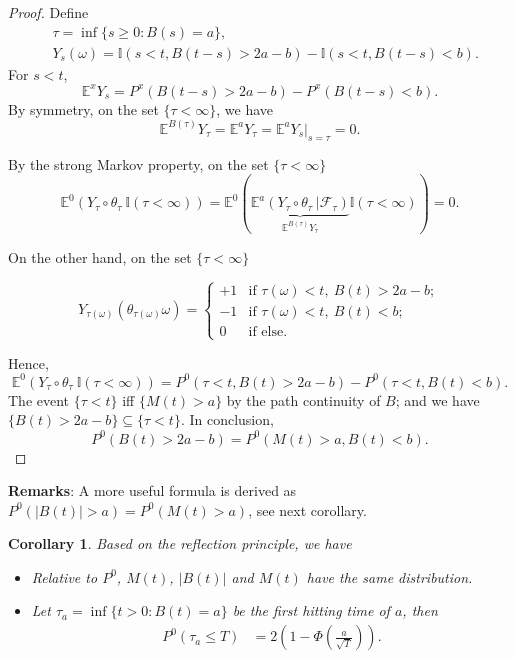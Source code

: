 \documentclass{article}
\theoremstyle{plain}
\newtheorem{corollary}{Corollary}
\theoremstyle{definition}
\begin{document}
\begin{proof}
Define 
\begin{align*}
    &\tau = \inf\{s\ge 0 : B(s)=a\},\\
    &Y_s(\omega) = \mathbb{I}(s<t,B(t-s)>2a-b)-\mathbb{I}(s<t,B(t-s)<b).
\end{align*}
For $s<t$,
\[
\mathbb{E}^x Y_s = P^x(B(t-s)>2a-b)-P^x(B(t-s)<b).
\]
By symmetry, on the set $\{\tau<\infty\}$, we have
\[
\mathbb{E}^{B(\tau)} Y_\tau = \mathbb{E}^a Y_\tau = \mathbb{E}^a Y_s |_{s=\tau} = 0.
\]

By the strong Markov property, on the set $\{\tau<\infty\}$
\[
\mathbb{E}^0\left(Y_\tau\circ\theta_\tau\ \mathbb{I}(\tau<\infty)\right) = \mathbb{E}^0\left(\underbrace{\mathbb{E}^a\left(Y_\tau\circ\theta_\tau\ |\mathcal{F}_\tau\right)}_{\mathbb{E}^{B(\tau)}Y_\tau}\mathbb{I}(\tau<\infty)\right) = 0.
\]

On the other hand, on the set $\{\tau<\infty\}$

\[
 Y_{\tau(\omega)}(\theta_{\tau(\omega)}\omega) = \begin{cases}
    +1 & \text{if }\tau(\omega)<t,\ B(t)>2a-b;\\
    -1 & \text{if }\tau(\omega)<t,\ B(t)<b;\\
    0 & \text{if else}.
\end{cases}
\]

Hence,
\[
\mathbb{E}^0\left(Y_\tau\circ\theta_\tau\ \mathbb{I}(\tau<\infty)\right) = P^0(\tau<t,B(t)>2a-b)-P^0(\tau<t,B(t)<b).
\]
The event $\{\tau<t\}$ iff $\{M(t)>a\}$ by the path continuity of $B$; and we have $\{B(t)>2a-b\}\subseteq\{\tau<t\}$. In conclusion,
\[
P^0(B(t)>2a-b) = P^0(M(t)>a,B(t)<b).
\]
\end{proof}

\textbf{Remarks}: A more useful formula is derived as $P^0(|B(t)|>a) = P^0(M(t)>a)$, see next corollary.

\begin{corollary}
Based on the reflection principle, we have
\begin{itemize}
    \item Relative to $P^0$, $M(t)$, $|B(t)|$ and $M(t)$ have the same distribution.
    \item Let $\tau_a = \inf\{t>0 : B(t)=a\}$ be the first hitting time of $a$, then
    \begin{align}
        P^0(\tau_a\le T) &= 2\left(1-\Phi\left(\frac{a}{\sqrt{T}}\right)\right).
    \end{align}
\end{itemize}
\end{corollary}
\end{document}
